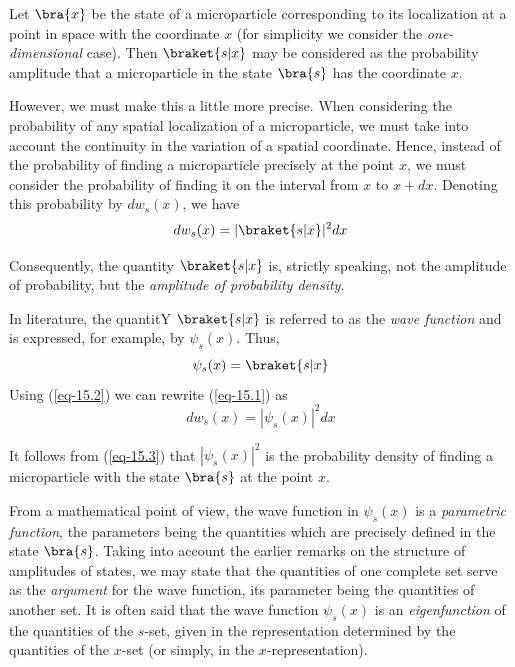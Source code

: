 \documentclass[a4paper,sfsidenotes,colorlinks=true]{tufte-book}
\numberwithin{equation}{section}
\numberwithin{figure}{section}
\begin{document}
Let 
$\bra{x}$ be the state of a microparticle corresponding to its
localization at a point in space with the coordinate $x$ (for
simplicity we consider the \emph{one-dimensional} case). Then
$\braket{s |x}$ may be considered as the probability amplitude that
a microparticle in the state $\bra{s}$ has the coordinate $x$.

However, we must make this a little more precise. When considering the
probability of any spatial localization of a microparticle, we must
take into account the continuity in the variation of a spatial
coordinate. Hence, instead of the probability of finding a
microparticle precisely at the point $x$, we must consider the
probability of finding it on the interval from $x$ to $x + dx$. Denoting
this probability by $dw_{s} (x)$, we have
\begin{equation}%
dw_{s} (x) = |\braket{s|x}|^{2} dx
\label{eq-15.1}
\end{equation}

Consequently, the quantity $\braket{s|x}$ is, strictly speaking, not the
amplitude of probability, but the \emph{amplitude of probability density}.

In literature, the quantitY $\braket{s|x}$ is referred to as the \emph{wave
function} and is expressed, for example, by $\psi_{s} (x)$. Thus,
\begin{equation}%
\psi_{s} (x) = \braket{s|x} 
\label{eq-15.2}
\end{equation}
Using (\ref{eq-15.2}) we can rewrite (\ref{eq-15.1}) as
\begin{equation}%
dw_{s} (x) = |\psi_{s}(x)|^{2} dx
\label{eq-15.3}
\end{equation}

It follows from (\ref{eq-15.3}) that $ |\psi_{s}(x)|^{2}$ is the
probability density of finding a microparticle with the state $\bra{s}$ at the point $x$. 

From a mathematical point of view, the wave function in $\psi_{s}(x)$
is a \emph{parametric function}, the parameters being the quantities which
are precisely defined in the state $\bra{s}$. Taking into account the
earlier remarks on the structure of amplitudes of states, we may state
that the quantities of one complete set serve as the \emph{argument} for the
wave function, its parameter being the quantities of another set. It
is often said that the wave function $\psi_{s}(x)$ is an \emph{eigenfunction} of
the quantities of the $s$-set, given in the representation determined
by the quantities of the $x$-set (or simply, in the $x$-representation).
\end{document}
